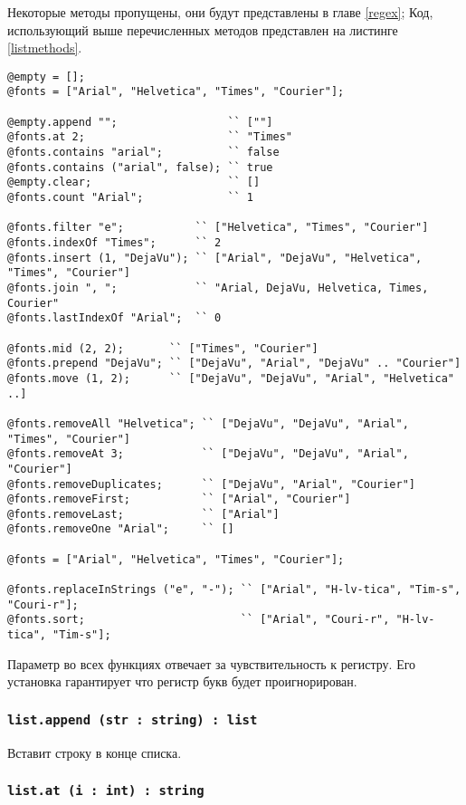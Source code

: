Некоторые методы пропущены, они будут представлены в главе \ref{regex}; Код, использующий выше перечисленных методов представлен на листинге \ref{listmethods}. 

\begin{lstlisting}[caption=Методы класса list, label=listmethods]
@empty = [];
@fonts = ["Arial", "Helvetica", "Times", "Courier"];

@empty.append "";                 `` [""]
@fonts.at 2;                      `` "Times"
@fonts.contains "arial";          `` false
@fonts.contains ("arial", false); `` true
@empty.clear;                     `` []
@fonts.count "Arial";             `` 1

@fonts.filter "e";           `` ["Helvetica", "Times", "Courier"]
@fonts.indexOf "Times";      `` 2
@fonts.insert (1, "DejaVu"); `` ["Arial", "DejaVu", "Helvetica", "Times", "Courier"]
@fonts.join ", ";            `` "Arial, DejaVu, Helvetica, Times, Courier"
@fonts.lastIndexOf "Arial";  `` 0

@fonts.mid (2, 2);       `` ["Times", "Courier"]
@fonts.prepend "DejaVu"; `` ["DejaVu", "Arial", "DejaVu" .. "Courier"]
@fonts.move (1, 2);      `` ["DejaVu", "DejaVu", "Arial", "Helvetica" ..]

@fonts.removeAll "Helvetica"; `` ["DejaVu", "DejaVu", "Arial", "Times", "Courier"]
@fonts.removeAt 3;            `` ["DejaVu", "DejaVu", "Arial", "Courier"]
@fonts.removeDuplicates;      `` ["DejaVu", "Arial", "Courier"]
@fonts.removeFirst;           `` ["Arial", "Courier"]
@fonts.removeLast;            `` ["Arial"]
@fonts.removeOne "Arial";     `` []

@fonts = ["Arial", "Helvetica", "Times", "Courier"];

@fonts.replaceInStrings ("e", "-"); `` ["Arial", "H-lv-tica", "Tim-s", "Couri-r"];
@fonts.sort;                        `` ["Arial", "Couri-r", "H-lv-tica", "Tim-s"];
\end{lstlisting}

Параметр  во всех функциях отвечает за чувствительность к регистру. Его установка гарантирует что регистр букв будет проигнорирован.

\subsubsection{\lstinline|list.append (str : string) : list|}

Вставит строку  в конце списка.

\subsubsection{\lstinline|list.at (i : int) : string|}

